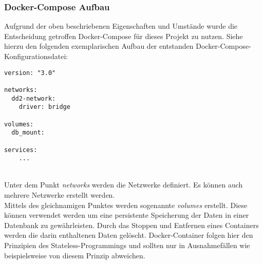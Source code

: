 \subsubsection{Docker-Compose Aufbau}
Aufgrund der oben beschriebenen Eigenschaften und Umstände wurde die Entscheidung getroffen 
Docker-Compose für dieses Projekt zu nutzen. Siehe hierzu den folgenden exemplarischen Aufbau 
der entstanden Docker-Compose-Konfigurationsdatei: 

\begin{lstlisting}[caption={Aufbau der Docker-Compose}, captionpos=b, label={fig:Docker Compose Aufbau}]
version: "3.0"

networks:
  dd2-network:
    driver: bridge

volumes: 
  db_mount:

services:
    ...
\end{lstlisting}
~\\Unter dem Punkt \textit{networks} werden die Netzwerke definiert. Es können auch mehrere Netzwerke 
erstellt werden.\\
Mittels des gleichnamigen Punktes werden sogenannte \textit{volumes} erstellt. Diese können verwendet 
werden um eine persistente Speicherung der Daten in einer Datenbank zu gewährleisten. Durch das 
Stoppen und Entfernen eines Containers werden die darin enthaltenen Daten gelöscht. 
Docker-Container folgen hier den Prinzipien des Stateless-Programmings \cite{stateless-programming} und 
sollten nur in Ausnahmefällen wie beispielsweise von diesem Prinzip abweichen.
